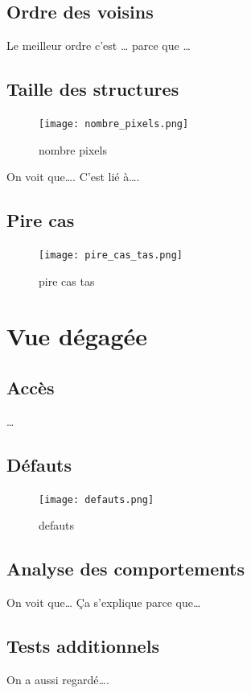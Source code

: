 \documentclass[
]{article}
\begin{document}
\hypertarget{ordre-des-voisins}{%
\subsection{Ordre des voisins}\label{ordre-des-voisins}}

Le meilleur ordre c'est \ldots{} parce que \ldots{}

\hypertarget{taille-des-structures}{%
\subsection{Taille des structures}\label{taille-des-structures}}

\begin{figure}
\centering
\texttt{[image: nombre\_pixels.png]}
\caption{nombre pixels}
\end{figure}

On voit que\ldots. C'est lié à\ldots.

\hypertarget{pire-cas}{%
\subsection{Pire cas}\label{pire-cas}}

\begin{figure}
\centering
\texttt{[image: pire\_cas\_tas.png]}
\caption{pire cas tas}
\end{figure}

\hypertarget{vue-duxe9gaguxe9e}{%
\section{Vue dégagée}\label{vue-duxe9gaguxe9e}}

\hypertarget{accuxe8s}{%
\subsection{Accès}\label{accuxe8s}}

\ldots{}

\hypertarget{duxe9fauts}{%
\subsection{Défauts}\label{duxe9fauts}}

\begin{figure}
\centering
\texttt{[image: defauts.png]}
\caption{defauts}
\end{figure}

\hypertarget{analyse-des-comportements}{%
\subsection{Analyse des comportements}\label{analyse-des-comportements}}

On voit que\ldots{} Ça s'explique parce que\ldots{}

\hypertarget{tests-additionnels}{%
\subsection{Tests additionnels}\label{tests-additionnels}}

On a aussi regardé\ldots.
\end{document}
